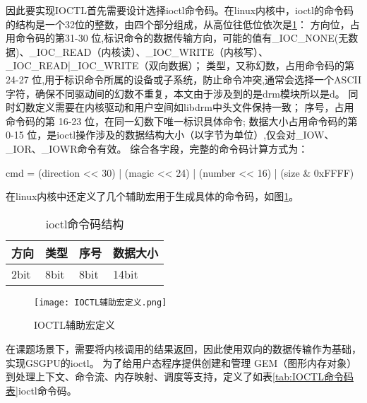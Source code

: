 因此要实现IOCTL首先需要设计选择ioctl命令码。在linux内核中，ioctl的命令码的结构是一个32位的整数，由四个部分组成，从高位往低位依次是\ref{tab:ioctl命令码结构}：
方向位，占用命令码的第 ​31-30 位​,标识命令的数据传输方向，可能的值有\_IOC\_NONE(无数据)、\_IOC\_READ（内核读）、\_IOC\_WRITE（内核写）、\_IOC\_READ|\_IOC\_WRITE（双向数据）；
类型，又称幻数，占用命令码的第 ​24-27 位,用于标识命令所属的设备或子系统，防止命令冲突,通常会选择一个ASCII 字符，确保不同驱动间的幻数不重复，本文由于涉及到的是drm模块所以是d。
同时幻数定义需要在内核驱动和用户空间如libdrm中头文件保持一致；
序号，占用命令码的第 ​16-23 位，在同一幻数下唯一标识具体命令;
数据大小占用命令码的第 ​0-15 位，是ioctl操作涉及的数据结构大小（以字节为单位）,仅会对\_IOW、\_IOR、\_IOWR命令有效。
综合各字段，完整的命令码计算方式为：

cmd = (direction << 30) | (magic << 24) | (number << 16) | (size \& 0xFFFF)

在linux内核中还定义了几个辅助宏用于生成具体的命令码，如图\ref{fig:IOCTL辅助宏定义}。

\begin{table}[h]
  \centering
  \caption{ioctl命令码结构}
  \label{tab:ioctl命令码结构}
  \begin{tabular}{llll}
    \toprule
    方向  & 类型 & 序号 & 数据大小 \\
    \midrule
    2bit & 8bit & 8bit & 14bit \\
    \bottomrule
  \end{tabular}
  \note{}
\end{table}

\begin{figure}[h]
  \centering
  \texttt{[image: IOCTL辅助宏定义.png]}
  \caption{IOCTL辅助宏定义}
  \label{fig:IOCTL辅助宏定义}
\end{figure}

在课题场景下，需要将内核调用的结果返回，因此使用双向的数据传输作为基础，实现GSGPU的ioctl。
为了给用户态程序提供创建和管理 GEM（图形内存对象）到处理上下文、命令流、内存映射、调度等支持，定义了如表\ref{tab:IOCTL命令码表}ioctl命令码。

